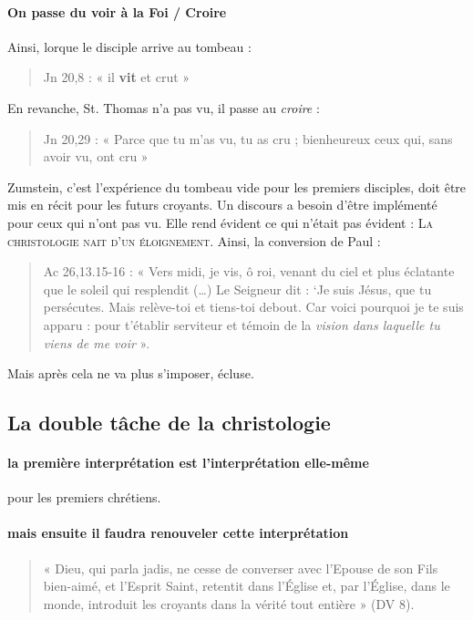     \paragraph{On passe du voir à la Foi / Croire}
    Ainsi, lorque le disciple arrive au tombeau : 
    \begin{quote}
        Jn 20,8  :  «  il  \textbf{vit}  et  crut  »   
    \end{quote}
    En revanche, St. Thomas n'a pas vu, il passe au \textit{croire} : 
    \begin{quote}
            Jn 20,29  :  «  Parce  que  tu m’as  vu, tu as  cru  ;  bienheureux ceux qui, sans  avoir vu, ont  cru  »   
    \end{quote}
    Zumstein, c'est l'expérience du tombeau vide pour les premiers disciples, doit être mis en récit pour les futurs croyants. Un discours a besoin d'être implémenté pour ceux qui n'ont pas vu. Elle rend évident ce qui n'était pas évident : \textsc{La christologie nait d'un éloignement}. Ainsi, la conversion de Paul : 
   \begin{quote}
       Ac  26,13.15-16  :  «  Vers  midi,  je  vis,  ô  roi,  venant  du  ciel  et  plus  éclatante  que  le  soleil  qui resplendit  (…)  Le  Seigneur  dit  :  ‘Je  suis  Jésus,  que  tu  persécutes.  Mais  relève-toi  et  tiens-toi debout.  Car  voici  pourquoi  je  te  suis  apparu  :  pour  t’établir  serviteur  et  témoin  de  la  \emph{vision dans  laquelle  tu viens  de  me  voir}  ». 
   \end{quote}
    Mais après cela ne va plus s'imposer, écluse.
    
\subsection{La double tâche de la christologie}

\paragraph{la première interprétation est l'interprétation elle-même} pour les premiers chrétiens. 

\paragraph{mais ensuite il faudra renouveler cette interprétation}
  \begin{quote}
      «  Dieu,  qui  parla  jadis,  ne  cesse  de  converser  avec  l’Epouse  de  son  Fils  bien-aimé,  et  l’Esprit Saint,  retentit  dans  l’Église  et,  par  l’Église,  dans  le  monde,  introduit  les  croyants  dans  la  vérité tout  entière  »  (DV  8). 
  \end{quote}



